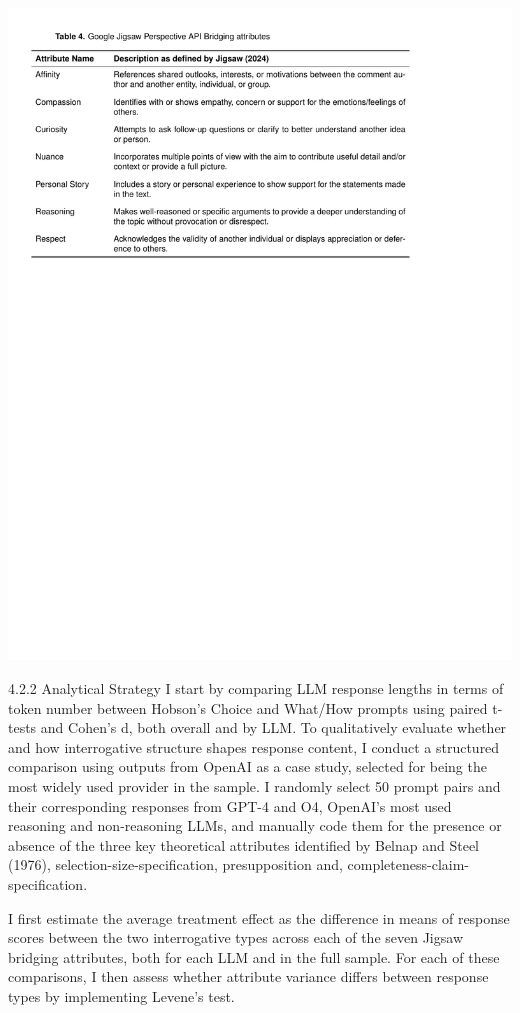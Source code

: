 \documentclass[
  12pt,
]{article}
\begin{document}
\includegraphics{../03_outputs/03_experimental_analyses/table_4.pdf}

4.2.2 Analytical Strategy
I start by comparing LLM response lengths in terms of token number between Hobson's Choice and What/How prompts using paired t-tests and Cohen's d, both overall and by LLM. To qualitatively evaluate whether and how interrogative structure shapes response content, I conduct a structured comparison using outputs from OpenAI as a case study, selected for being the most widely used provider in the sample. I randomly select 50 prompt pairs and their corresponding responses from GPT-4 and O4, OpenAI's most used reasoning and non-reasoning LLMs, and manually code them for the presence or absence of the three key theoretical attributes identified by Belnap and Steel (1976), selection-size-specification, presupposition and, completeness-claim-specification.

I first estimate the average treatment effect as the difference in means of response scores between the two interrogative types across each of the seven Jigsaw bridging attributes, both for each LLM and in the full sample. For each of these comparisons, I then assess whether attribute variance differs between response types by implementing Levene's test.
\end{document}
